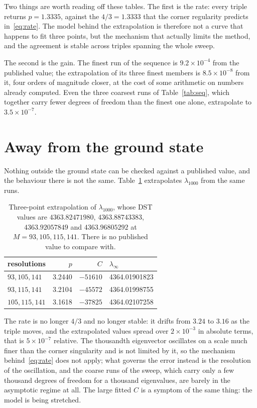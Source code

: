 \documentclass[11pt,a4paper]{article}
\begin{document}
Two things are worth reading off these tables. The first is the rate: every
triple returns $p = 1.3335$, against the $4/3 = 1.3333$ that the corner
regularity predicts in~\eqref{eq:rate}. The model behind the extrapolation is
therefore not a curve that happens to fit three points, but the mechanism that
actually limits the method, and the agreement is stable across triples spanning
the whole sweep.

The second is the gain. The finest run of the sequence is $9.2 \times 10^{-4}$
from the published value; the extrapolation of its three finest members is
$8.5 \times 10^{-8}$ from it, four orders of magnitude closer, at the cost of
some arithmetic on numbers already computed. Even the three coarsest runs of
Table~\ref{tab:seq}, which together carry fewer degrees of freedom than the
finest one alone, extrapolate to $3.5 \times 10^{-7}$.

\section{Away from the ground state}

Nothing outside the ground state can be checked against a published value, and
the behaviour there is not the same. Table~\ref{tab:deep} extrapolates
$\lambda_{1000}$ from the same runs.

\begin{table}[htbp]
  \centering
  \caption{Three-point extrapolation of $\lambda_{1000}$, whose DST values are
           $4363.82471980$, $4363.88743383$, $4363.92057849$ and
           $4363.96805292$ at $M = 93, 105, 115, 141$. There is no published
           value to compare with.}
  \label{tab:deep}
  \begin{tabular}{lrrl}
    \toprule
    resolutions & $p$ & $C$ & $\lambda_\infty$ \\
    \midrule
    $93, 105, 141$  & 3.2440 & $-51610$ & 4364.01901823 \\
    $93, 115, 141$  & 3.2104 & $-45572$ & 4364.01998755 \\
    $105, 115, 141$ & 3.1618 & $-37825$ & 4364.02107258 \\
    \bottomrule
  \end{tabular}
\end{table}

The rate is no longer $4/3$ and no longer stable: it drifts from $3.24$ to
$3.16$ as the triple moves, and the extrapolated values spread over
$2 \times 10^{-3}$ in absolute terms, that is $5 \times 10^{-7}$ relative. The
thousandth eigenvector oscillates on a scale much finer than the corner
singularity and is not limited by it, so the mechanism behind~\eqref{eq:rate}
does not apply; what governs the error instead is the resolution of the
oscillation, and the coarse runs of the sweep, which carry only a few thousand
degrees of freedom for a thousand eigenvalues, are barely in the asymptotic
regime at all. The large fitted $C$ is a symptom of the same thing: the model is
being stretched.
\end{document}
